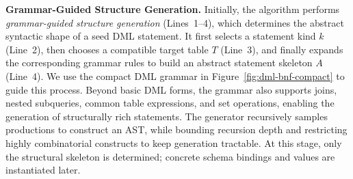 \textbf{Grammar-Guided Structure Generation.}
Initially, the algorithm performs \emph{grammar-guided structure generation} (Lines~1--4), which determines the abstract syntactic shape of a seed DML statement.
It first selects a statement kind $k$ (Line~2), then chooses a compatible target table $T$ (Line~3), and finally expands the corresponding grammar rules to build an abstract statement skeleton $A$ (Line~4).
We use the compact DML grammar in Figure~\ref{fig:dml-bnf-compact} to guide this process.
Beyond basic DML forms, the grammar also supports joins, nested subqueries, common table expressions, and set operations, enabling the generation of structurally rich statements.
The generator recursively samples productions to construct an AST, while bounding recursion depth and restricting highly combinatorial constructs to keep generation tractable.
At this stage, only the structural skeleton is determined; concrete schema bindings and values are instantiated later.

